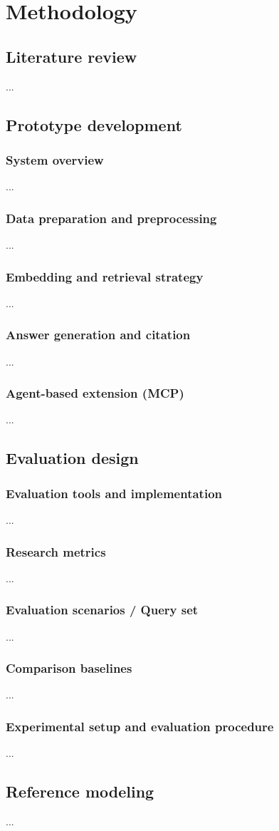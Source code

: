 \chapter{Methodology}

\section{Literature review}
...

\section{Prototype development}

\subsection{System overview}
...

\subsection{Data preparation and preprocessing}
...

\subsection{Embedding and retrieval strategy}
...

\subsection{Answer generation and citation}
...

\subsection{Agent-based extension (MCP)}
...

\section{Evaluation design}

\subsection{Evaluation tools and implementation}
...

\subsection{Research metrics}
...

\subsection{Evaluation scenarios / Query set}
...

\subsection{Comparison baselines}
...

\subsection{Experimental setup and evaluation procedure}
...

\section{Reference modeling}
...